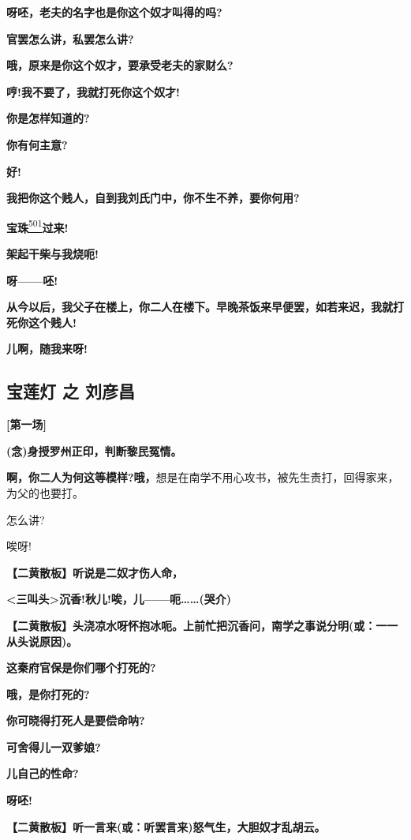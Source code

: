 \textbf{呀呸，老夫的名字也是你这个奴才叫得的吗?}

\textbf{官罢怎么讲，私罢怎么讲?}

\textbf{哦，原来是你这个奴才，要承受老夫的家财么?}

\textbf{哼!我不要了，我就打死你这个奴才!}

\textbf{你是怎样知道的?}

\textbf{你有何主意?}

\textbf{好!}

\textbf{我把你这个贱人，自到我刘氏门中，你不生不养，要你何用?}

\textbf{宝珠}\protect\hyperlink{fn501}{\textsuperscript{501}}\textbf{过来!}

\textbf{架起干柴与我烧呃!}

\textbf{呀------呸!}

\textbf{从今以后，我父子在楼上，你二人在楼下。早晚茶饭来早便罢，如若来迟，我就打死你这个贱人!}

\textbf{儿啊，随我来呀!}

\hypertarget{ux5b9dux83b2ux706f-ux4e4b-ux5218ux5f66ux660c}{%
\subsection{宝莲灯 之
刘彦昌}\label{ux5b9dux83b2ux706f-ux4e4b-ux5218ux5f66ux660c}}

\textbf{{[}第一场{]}}

\textbf{(念)身授罗州正印，判断黎民冤情。}

\textbf{啊，你二人为何这等模样?哦，}想是在南学不用心攻书，被先生责打，回得家来，为父的也要打。

怎么讲?

唉呀!

\textbf{【二黄散板】听说是二奴才伤人命，}

\textbf{\textless{}三叫头\textgreater{}沉香!秋儿!唉，儿------呃\ldots{}\ldots{}(哭介)}

\textbf{【二黄散板】头浇凉水呀怀抱冰呃。上前忙把沉香问，南学之事说分明(或：一一从头说原因)。}

\textbf{这秦府官保是你们哪个打死的?}

\textbf{哦，是你打死的?}

\textbf{你可晓得打死人是要偿命呐?}

\textbf{可舍得儿一双爹娘?}

\textbf{儿自己的性命?}

\textbf{呀呸!}

\textbf{【二黄散板】听一言来(或：听罢言来)怒气生，大胆奴才乱胡云。}

